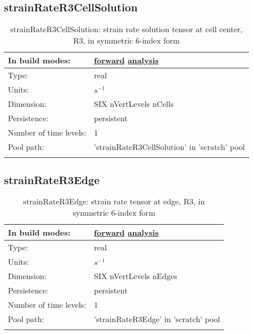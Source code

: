 \subsection[strainRateR3CellSolution]{strainRateR3CellSolution}
\label{subsec:var_sec_scratch_strainRateR3CellSolution}
\begin{center}
\begin{longtable}{| p{2.0in} | p{4.0in} |}
        \hline 
        In build modes: & \hyperref[subsec:forward_var_tab_scratch]{forward} \hyperref[subsec:analysis_var_tab_scratch]{analysis} \\
        \hline 
        Type: & real \\
        \hline 
        Units: & $s^{-1}$ \\
        \hline 
        Dimension: & SIX nVertLevels nCells \\
        \hline 
        Persistence: & persistent \\
        \hline 
        Number of time levels: & 1 \\
        \hline 
            Pool path: & 'strainRateR3CellSolution' in 'scratch' pool
 \\
		 \hline 
    \caption{strainRateR3CellSolution: strain rate solution tensor at cell center, R3, in symmetric 6-index form}
\end{longtable}
\end{center}
\subsection[strainRateR3Edge]{strainRateR3Edge}
\label{subsec:var_sec_scratch_strainRateR3Edge}
\begin{center}
\begin{longtable}{| p{2.0in} | p{4.0in} |}
        \hline 
        In build modes: & \hyperref[subsec:forward_var_tab_scratch]{forward} \hyperref[subsec:analysis_var_tab_scratch]{analysis} \\
        \hline 
        Type: & real \\
        \hline 
        Units: & $s^{-1}$ \\
        \hline 
        Dimension: & SIX nVertLevels nEdges \\
        \hline 
        Persistence: & persistent \\
        \hline 
        Number of time levels: & 1 \\
        \hline 
            Pool path: & 'strainRateR3Edge' in 'scratch' pool
 \\
		 \hline 
    \caption{strainRateR3Edge: strain rate tensor at edge, R3, in symmetric 6-index form}
\end{longtable}
\end{center}
